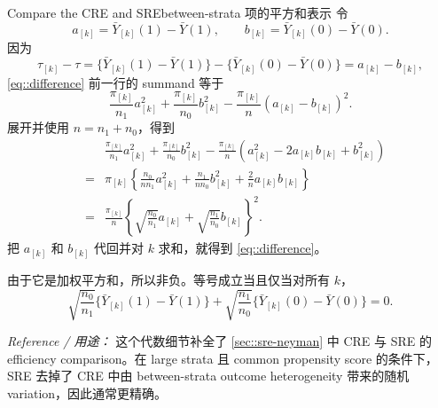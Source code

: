 \begin{exercisesolution}{Compare the CRE and SRE}{between-strata 项的平方和表示}
令
\[
a_{[k]}=\bar Y_{[k]}(1)-\bar Y(1),\qquad
b_{[k]}=\bar Y_{[k]}(0)-\bar Y(0).
\]
因为
\[
\tau_{[k]}-\tau
=\{\bar Y_{[k]}(1)-\bar Y(1)\}
-\{\bar Y_{[k]}(0)-\bar Y(0)\}
=a_{[k]}-b_{[k]},
\]
\cref{eq::difference} 前一行的 summand 等于
\[
\frac{\pi_{[k]}}{n_1}a_{[k]}^2
+\frac{\pi_{[k]}}{n_0}b_{[k]}^2
-\frac{\pi_{[k]}}{n}(a_{[k]}-b_{[k]})^2.
\]
展开并使用 $n=n_1+n_0$，得到
\begin{eqnarray*}
&&
\frac{\pi_{[k]}}{n_1}a_{[k]}^2
+\frac{\pi_{[k]}}{n_0}b_{[k]}^2
-\frac{\pi_{[k]}}{n}(a_{[k]}^2-2a_{[k]}b_{[k]}+b_{[k]}^2)\\
&=&
\pi_{[k]}\left\{
\frac{n_0}{nn_1}a_{[k]}^2
+\frac{n_1}{nn_0}b_{[k]}^2
+\frac{2}{n}a_{[k]}b_{[k]}
\right\}\\
&=&
\frac{\pi_{[k]}}{n}
\left\{
\sqrt{\frac{n_0}{n_1}}a_{[k]}
+\sqrt{\frac{n_1}{n_0}}b_{[k]}
\right\}^2.
\end{eqnarray*}
把 $a_{[k]}$ 和 $b_{[k]}$ 代回并对 $k$ 求和，就得到 \cref{eq::difference}。

由于它是加权平方和，所以非负。等号成立当且仅当对所有 $k$，
\[
\sqrt{\frac{n_0}{n_1}}\{\bar Y_{[k]}(1)-\bar Y(1)\}
+\sqrt{\frac{n_1}{n_0}}\{\bar Y_{[k]}(0)-\bar Y(0)\}=0.
\]

\emph{Reference / 用途：} 这个代数细节补全了 \cref{sec::sre-neyman} 中 CRE 与 SRE 的 efficiency comparison。在 large strata 且 common propensity score 的条件下，SRE 去掉了 CRE 中由 between-strata outcome heterogeneity 带来的随机 variation，因此通常更精确。
\end{exercisesolution}

